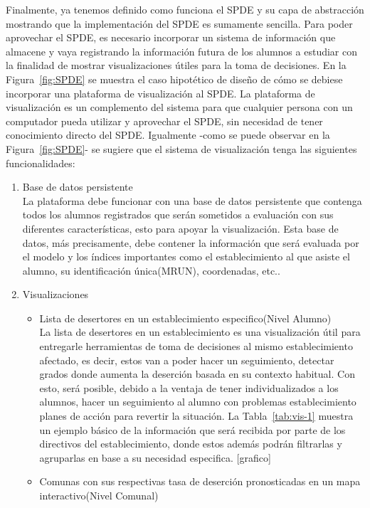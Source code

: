 Finalmente, ya tenemos definido como funciona el SPDE y su capa de abstracción mostrando que la implementación del SPDE es sumamente sencilla. Para poder aprovechar el SPDE, es necesario incorporar un sistema de información que almacene y vaya registrando la información futura de los alumnos a estudiar con la finalidad de mostrar visualizaciones útiles para la toma de decisiones. En la Figura~\ref{fig:SPDE} se muestra el caso hipotético de diseño de cómo se debiese incorporar una plataforma de visualización al SPDE. La plataforma de visualización es un complemento del sistema para que cualquier persona con un computador pueda utilizar y aprovechar el SPDE, sin necesidad de tener conocimiento directo del SPDE. Igualmente -como se puede observar en la Figura~\ref{fig:SPDE}- se sugiere que el sistema de visualización tenga las siguientes funcionalidades:
\begin{enumerate}
\item Base de datos persistente \\ \hfill
La plataforma debe funcionar con una base de datos persistente que contenga todos los alumnos registrados que serán sometidos a evaluación con sus diferentes características, esto para apoyar la visualización. Esta base de datos, más precisamente, debe contener la información que será evaluada por el modelo y los índices importantes como el establecimiento al que asiste el alumno, su identificación única(MRUN), coordenadas, etc..
\item Visualizaciones
    \begin{itemize}
    \item Lista de desertores en un establecimiento especifico(Nivel Alumno) \\ \hfill
    La lista de desertores en un establecimiento es una visualización útil para entregarle herramientas de toma de decisiones al mismo establecimiento afectado, es decir, estos van a poder hacer un seguimiento, detectar grados donde aumenta la deserción basada en su contexto habitual. Con esto, será posible, debido a la ventaja de tener individualizados a los alumnos, hacer un seguimiento al alumno con problemas establecimiento planes de acción para revertir la situación. La Tabla~\ref{tab:vis-1} muestra un ejemplo básico de la información que será recibida por parte de los directivos del establecimiento, donde estos además podrán filtrarlas y agruparlas en base a su necesidad especifica.
    [grafico]
    \item Comunas con sus respectivas tasa de deserción pronosticadas en un mapa interactivo(Nivel Comunal) \\ \hfill

\end{itemize}
\end{enumerate}
